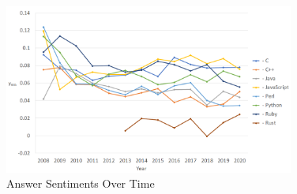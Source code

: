 \documentclass[conference]{IEEEtran}
\begin{document}
\begin{figure}[htbp]
\centering
\includegraphics[width=0.85\textwidth]{figures/time_answers_em.png}
\caption{Answer Sentiments Over Time}
\label{fig}
\end{figure}
\end{document}
